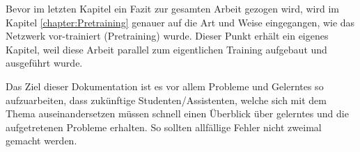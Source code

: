 Bevor im letzten Kapitel ein Fazit zur gesamten Arbeit gezogen wird, wird im Kapitel \ref{chapter:Pretraining} genauer auf die Art und Weise eingegangen, wie das Netzwerk vor-trainiert (Pretraining) wurde. 
Dieser Punkt erhält ein eigenes Kapitel, weil diese Arbeit \grqq{}parallel\grqq{} zum eigentlichen Training aufgebaut und ausgeführt wurde.

Das Ziel dieser Dokumentation ist es vor allem Probleme und Gelerntes so aufzuarbeiten, dass zukünftige Studenten/Assistenten, welche sich mit dem Thema auseinandersetzen müssen schnell einen Überblick über gelerntes und die aufgetretenen Probleme erhalten.
So sollten allfällige Fehler nicht zweimal gemacht werden.

